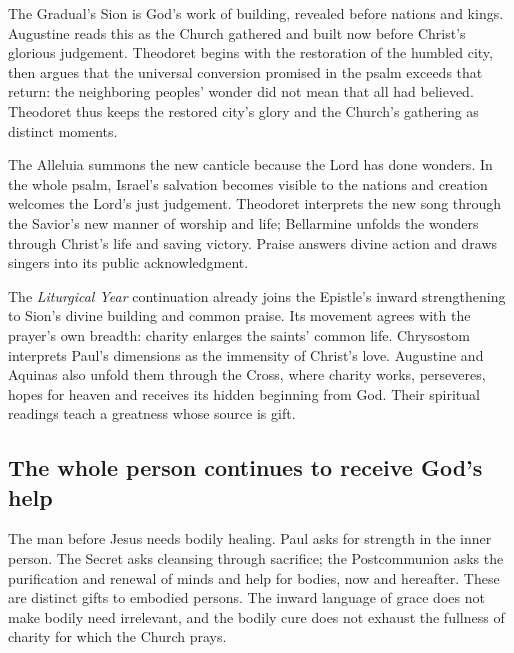 The Gradual's Sion is God's work of building, revealed before nations and kings. Augustine reads this as the Church gathered and built now before Christ's glorious judgement. Theodoret begins with the restoration of the humbled city, then argues that the universal conversion promised in the psalm exceeds that return: the neighboring peoples' wonder did not mean that all had believed. Theodoret thus keeps the restored city's glory and the Church's gathering as distinct moments. 

The Alleluia summons the new canticle because the Lord has done wonders. In the whole psalm, Israel's salvation becomes visible to the nations and creation welcomes the Lord's just judgement. Theodoret interprets the new song through the Savior's new manner of worship and life; Bellarmine unfolds the wonders through Christ's life and saving victory. Praise answers divine action and draws singers into its public acknowledgment. 

The \textit{Liturgical Year} continuation already joins the Epistle's inward strengthening to Sion's divine building and common praise. Its movement agrees with the prayer's own breadth: charity enlarges the saints' common life. Chrysostom interprets Paul's dimensions as the immensity of Christ's love. Augustine and Aquinas also unfold them through the Cross, where charity works, perseveres, hopes for heaven and receives its hidden beginning from God. Their spiritual readings teach a greatness whose source is gift. 

\subsection*{The whole person continues to receive God's help}
The man before Jesus needs bodily healing. Paul asks for strength in the inner person. The Secret asks cleansing through sacrifice; the Postcommunion asks the purification and renewal of minds and help for bodies, now and hereafter. These are distinct gifts to embodied persons. The inward language of grace does not make bodily need irrelevant, and the bodily cure does not exhaust the fullness of charity for which the Church prays. 

